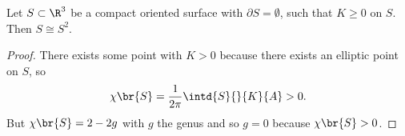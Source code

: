 \begin{corollary}
Let $ S \subset \R^3 $ be a compact oriented surface with $ \partial S = \emptyset $, such that $ K \ge 0 $ on $ S $. Then $ S \cong S^2 $.
\end{corollary}

\begin{proof}
There exists some point with $ K > 0 $ because there exists an elliptic point on $ S $, so
$$ \chi\br{S} = \dfrac{1}{2\pi}\intd{S}{}{K}{A} > 0. $$
But $ \chi\br{S} = 2 - 2g $ with $ g $ the genus and so $ g = 0 $ because $ \chi\br{S} > 0 $.
\end{proof}


